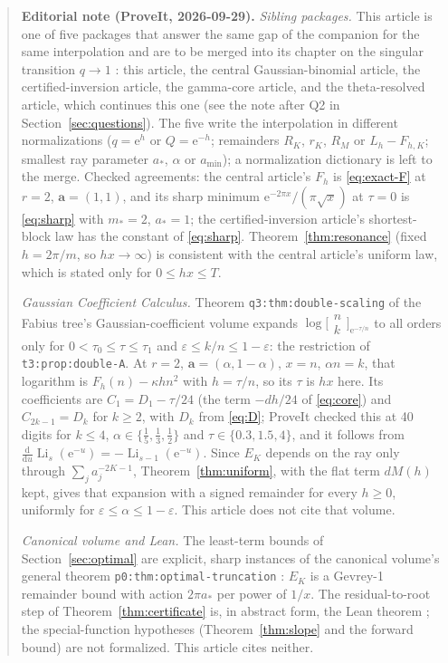 \documentclass[11pt,a4paper]{article}
\numberwithin{equation}{section}
\theoremstyle{definition}\newtheorem{definition}[theorem]{Definition}
\theoremstyle{remark}\newtheorem{remark}[theorem]{Remark}
\DeclareMathOperator{\Li}{Li}
\newcommand{\e}{\mathrm e}
\newcommand{\avec}{\boldsymbol a}
\begin{document}
\begin{quote}\small
\textbf{Editorial note (ProveIt, 2026-09-29).}
\emph{Sibling packages.} This article is one of five packages that answer
the same gap of the companion for the same interpolation and are to be merged
into its chapter on the singular transition $q\to1$ \cite{ed:siblings}: this
article, the central Gaussian-binomial article, the certified-inversion
article, the gamma-core article, and the theta-resolved article, which
continues this one (see the note after Q2 in Section~\ref{sec:questions}).
The five write the interpolation in different normalizations ($q=\e^h$ or $Q=\e^{-h}$; remainders $R_K$, $r_K$, $R_M$ or $L_h-F_{h,K}$; smallest ray parameter $a_*$, $\alpha$ or $a_{\min}$); a normalization dictionary is left to the merge.
Checked agreements: the central article's $F_h$ is \eqref{eq:exact-F} at
$r=2$, $\avec=(1,1)$, and its sharp minimum $\e^{-2\pi x}/(\pi\sqrt x)$ at
$\tau=0$ is \eqref{eq:sharp} with $m_*=2$, $a_*=1$; the certified-inversion
article's shortest-block law has the constant of \eqref{eq:sharp}.
Theorem~\ref{thm:resonance} (fixed $h=2\pi/m$, so $hx\to\infty$) is
consistent with the central article's uniform law, which is stated only for
$0\le hx\le T$.

\emph{Gaussian Coefficient Calculus.} Theorem \texttt{q3:thm:double-scaling}
of the Fabius tree's Gaussian-coefficient volume \cite{ed:gcc} expands
$\log\bigl[\begin{smallmatrix}n\\k\end{smallmatrix}\bigr]_{\e^{-\tau/n}}$ to
all orders only for $0<\tau_0\le\tau\le\tau_1$ and
$\varepsilon\le k/n\le1-\varepsilon$: the restriction of
\texttt{t3:prop:double-A}. At $r=2$, $\avec=(\alpha,1-\alpha)$, $x=n$,
$\alpha n=k$, that logarithm is $F_h(n)-\kappa hn^2$ with $h=\tau/n$, so its
$\tau$ is $hx$ here. Its coefficients are $C_1=D_1-\tau/24$ (the term
$-dh/24$ of \eqref{eq:core}) and $C_{2k-1}=D_k$ for $k\ge2$, with $D_k$ from
\eqref{eq:D}; ProveIt checked this at 40 digits for $k\le4$,
$\alpha\in\{\frac15,\frac13,\frac12\}$ and $\tau\in\{0.3,1.5,4\}$, and it
follows from $\frac{\mathrm d}{\mathrm du}\Li_s(\e^{-u})=-\Li_{s-1}(\e^{-u})$.
Since $E_K$ depends on the ray only through $\sum_ja_j^{-2K-1}$,
Theorem~\ref{thm:uniform}, with the flat term $dM(h)$ kept, gives that
expansion with a signed remainder for every $h\ge0$, uniformly for
$\varepsilon\le\alpha\le1-\varepsilon$. This article does not cite that
volume.

\emph{Canonical volume and Lean.} The least-term bounds of
Section~\ref{sec:optimal} are explicit, sharp instances of the canonical
volume's general theorem \texttt{p0:thm:optimal-truncation} \cite{ed:tai}:
$E_K$ is a Gevrey-1 remainder bound with action $2\pi a_*$ per power of
$1/x$. The residual-to-root step of Theorem~\ref{thm:certificate} is, in
abstract form, the Lean theorem 
\cite{ed:lean}; the special-function hypotheses (Theorem~\ref{thm:slope} and
the forward bound) are not formalized. This article cites neither.
\end{quote}
\end{document}
